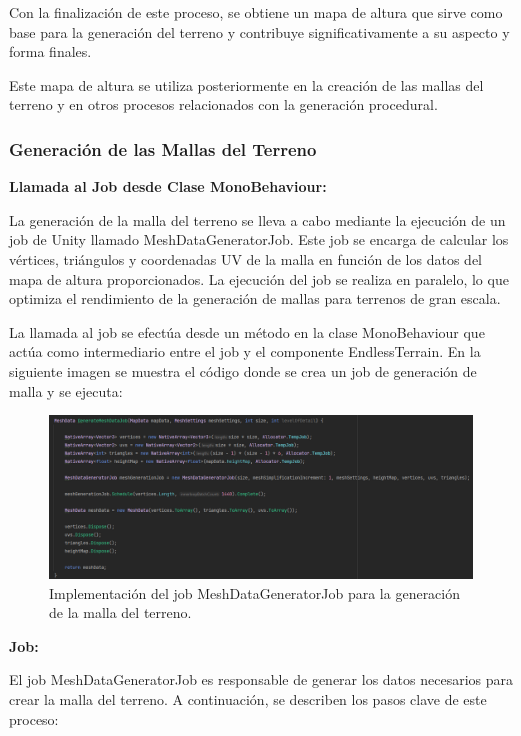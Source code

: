 Con la finalización de este proceso, se obtiene un mapa de altura que sirve como base para la generación del terreno y contribuye significativamente a su aspecto y forma finales.

Este mapa de altura se utiliza posteriormente en la creación de las mallas del terreno y en otros procesos relacionados con la generación procedural.

\subsubsection{Generación de las Mallas del Terreno}

\textbf{Llamada al Job desde Clase MonoBehaviour:}

La generación de la malla del terreno se lleva a cabo mediante la ejecución de un job de Unity llamado MeshDataGeneratorJob. Este job se encarga de calcular los vértices, triángulos y coordenadas UV de la malla en función de los datos del mapa de altura proporcionados. La ejecución del job se realiza en paralelo, lo que optimiza el rendimiento de la generación de mallas para terrenos de gran escala.

La llamada al job se efectúa desde un método en la clase MonoBehaviour que actúa como intermediario entre el job y el componente EndlessTerrain. En la siguiente imagen se muestra el código donde se crea un job de generación de malla y se ejecuta:

\begin{figure}[h]
\centering
\includegraphics[width=1\textwidth]{img/codes/GenerateMeshData.png}
\caption{Implementación del job MeshDataGeneratorJob para la generación de la malla del terreno.}
\end{figure}

\textbf{Job:}

El job MeshDataGeneratorJob es responsable de generar los datos necesarios para crear la malla del terreno. A continuación, se describen los pasos clave de este proceso:


